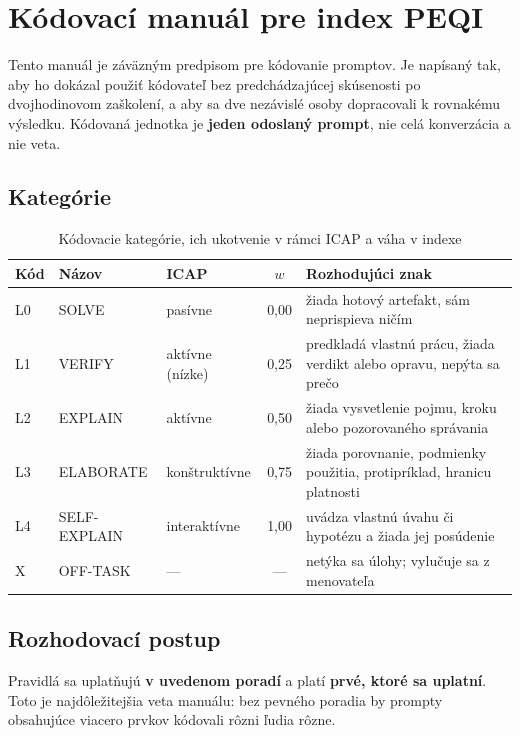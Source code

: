 \chapter{Kódovací manuál pre index PEQI}
\label{chapter:kodovaci-manual}

Tento manuál je záväzným predpisom pre kódovanie promptov. Je napísaný tak, aby ho dokázal použiť kódovateľ bez predchádzajúcej skúsenosti po dvojhodinovom zaškolení, a aby sa dve nezávislé osoby dopracovali k rovnakému výsledku. Kódovaná jednotka je \textbf{jeden odoslaný prompt}, nie celá konverzácia a nie veta.

\section{Kategórie}

\begin{table}[H]
\centering
\caption{Kódovacie kategórie, ich ukotvenie v rámci ICAP a váha v indexe}
\label{tab:taxonomia}
\small
\begin{tabularx}{\textwidth}{@{}l l l c X@{}}
\toprule
\textbf{Kód} & \textbf{Názov} & \textbf{ICAP} & \textbf{$w$} & \textbf{Rozhodujúci znak} \\
\midrule
L0 & SOLVE       & pasívne        & 0,00 & žiada hotový artefakt, sám neprispieva ničím \\
L1 & VERIFY      & aktívne (nízke)& 0,25 & predkladá vlastnú prácu, žiada verdikt alebo opravu, nepýta sa prečo \\
L2 & EXPLAIN     & aktívne        & 0,50 & žiada vysvetlenie pojmu, kroku alebo pozorovaného správania \\
L3 & ELABORATE   & konštruktívne  & 0,75 & žiada porovnanie, podmienky použitia, protipríklad, hranicu platnosti \\
L4 & SELF-EXPLAIN& interaktívne   & 1,00 & uvádza vlastnú úvahu či hypotézu a žiada jej posúdenie \\
X  & OFF-TASK    & --- & --- & netýka sa úlohy; vylučuje sa z menovateľa \\
\bottomrule
\end{tabularx}
\end{table}

\section{Rozhodovací postup}

Pravidlá sa uplatňujú \textbf{v uvedenom poradí} a platí \textbf{prvé, ktoré sa uplatní}. Toto je najdôležitejšia veta manuálu: bez pevného poradia by prompty obsahujúce viacero prvkov kódovali rôzni ľudia rôzne.

